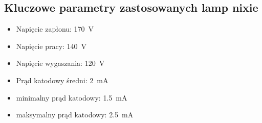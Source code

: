 \documentclass{article}
\begin{document}
\subsection{Kluczowe parametry zastosowanych lamp nixie}
\begin{itemize}
    \item Napięcie zapłonu: \SI{170}{\volt}
    \item Napięcie pracy: \SI{140}{\volt}
    \item Napięcie wygaszania: \SI{120}{\volt}
    \item Prąd katodowy średni: \SI{2}{\milli\ampere}
    \item minimalny prąd katodowy: \SI{1.5}{\milli\ampere}
    \item maksymalny prąd katodowy: \SI{2.5}{\milli\ampere}
\end{itemize}
\end{document}
